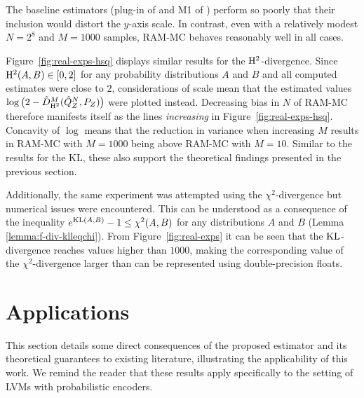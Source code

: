 The baseline estimators (plug-in of \cite{moon14ensemble} and M1 of \cite{nguyen10ratio}) perform so poorly that 
their inclusion would distort the $y$-axis scale.
In contrast, even with a relatively modest $N{=}2^8$ and $M{=}1000$ samples, RAM-MC behaves reasonably well in all cases.

Figure~\ref{fig:real-exps-hsq} displays similar results for the $\mathrm{H}^2$-divergence.
Since $\mathrm{H}^2(A,B) \in [0, 2]$ for any probability distributions $A$ and $B$ and all computed estimates were close to $2$,
considerations of scale mean that the estimated values $\log\big(2 - \hat{D}^M_{\mathrm{H}^2}(\hat{Q}^N_Z , P_Z)\big)$ were plotted instead.
Decreasing bias in $N$ of RAM-MC therefore manifests itself as the lines \emph{increasing} in Figure~\ref{fig:real-exps-hsq}. 
Concavity of $\log$ means that the reduction in variance when increasing $M$ results in RAM-MC with $M{=}1000$ being above RAM-MC with $M{=}10$.
Similar to the results for the KL, these also support the theoretical findings presented in the previous section.

Additionally, the same experiment was attempted using the $\chi^2$-divergence but numerical issues were encountered.
This can be understood as a consequence of the inequality $e^{\mathrm{KL}(A, B)} - 1 \leq \chi^2(A,B)$ for any distributions $A$ and $B$ (Lemma \ref{lemma:f-div-klleqchi}). 
From Figure~\ref{fig:real-exps} it can be seen that the $\mathrm{KL}$-divergence reaches values higher than $1000$, making the corresponding value of the $\chi^2$-divergence larger than can be represented using double-precision floats.






\section{Applications}\label{sec:applications}
This section details some direct consequences of the proposed estimator and its theoretical guarantees to existing literature, illustrating the applicability of this work.
We remind the reader that these results apply specifically to the setting of LVMs with probabilistic encoders.

